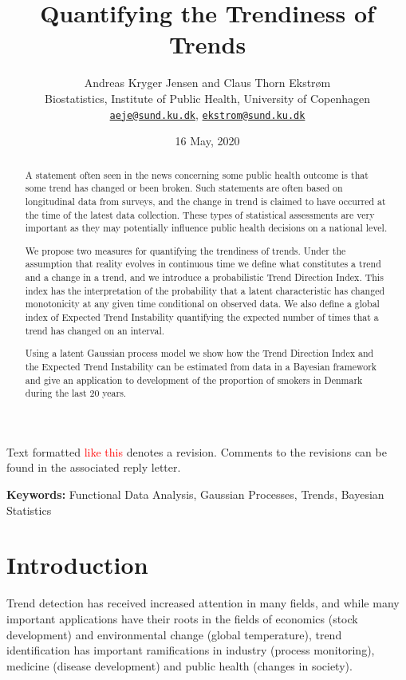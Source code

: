 \documentclass[11pt,]{article}
\title{Quantifying the Trendiness of Trends}
\author{Andreas Kryger Jensen and Claus Thorn Ekstrøm\\
Biostatistics, Institute of Public Health, University of Copenhagen\\
\href{mailto:aeje@sund.ku.dk}{\nolinkurl{aeje@sund.ku.dk}},
\href{mailto:ekstrom@sund.ku.dk}{\nolinkurl{ekstrom@sund.ku.dk}}}
\date{16 May, 2020}
\theoremstyle{nonumberplain}
\newcommand{\revision}[1]{\textcolor{red}{#1}}
\begin{document}
\maketitle

Text formatted \revision{like this} denotes a revision. Comments to the
revisions can be found in the associated reply letter.

\begin{abstract}
A statement often seen in the news concerning some public health outcome is that some trend has changed or been broken. Such statements are often based on longitudinal data from surveys, and the change in trend is claimed to have occurred at the time of the latest data collection. These types of statistical assessments are very important as they may potentially influence public health decisions on a national level.

We propose two measures for quantifying the trendiness of trends. Under the assumption that reality evolves in continuous time we define what constitutes a trend and a change in a trend, and we introduce a probabilistic Trend Direction Index. This index has the interpretation of the probability that a latent characteristic has changed monotonicity at any given time conditional on observed data. We also define a global index of Expected Trend Instability quantifying the expected number of times that a trend has changed on an interval.

Using a latent Gaussian process model we show how the Trend Direction Index and the Expected Trend Instability can be estimated from data in a Bayesian framework and give an application to development of the proportion of smokers in Denmark during the last 20 years.
\end{abstract}

\begin{center}
\textbf{Keywords:} Functional Data Analysis, Gaussian Processes, Trends, Bayesian Statistics
\end{center}

\section{Introduction}\label{introduction}

Trend detection has received increased attention in many fields, and
while many important applications have their roots in the fields of
economics (stock development) and environmental change (global
temperature), trend identification has important ramifications in
industry (process monitoring), medicine (disease development) and public
health (changes in society).
\end{document}

